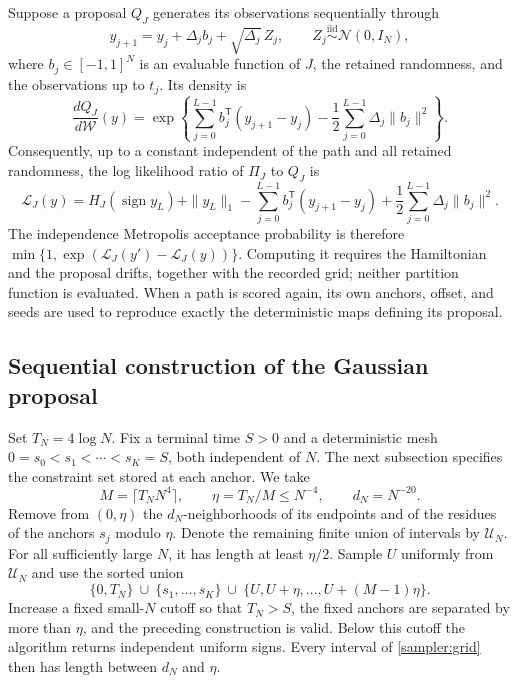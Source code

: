 \documentclass[11pt,reqno]{amsart}
\newcommand{\sign}{\operatorname{sign}}
\begin{document}
Suppose a proposal $Q_J$ generates its observations sequentially through
\begin{equation*}
 y_{j+1}=y_j+\Delta_j b_j+\sqrt{\Delta_j}\,Z_j,
 \qquad Z_j\stackrel{\mathrm{iid}}{\sim}\mathcal N(0,I_N),
\end{equation*}
where $b_j\in[-1,1]^N$ is an evaluable function of $J$, the retained
randomness, and the observations up to $t_j$. Its density is
\[
 \frac{dQ_J}{d\mathcal W}(y)
 =\exp\left\{\sum_{j=0}^{L-1}b_j^{\mathsf T}(y_{j+1}-y_j)
                   -\frac12\sum_{j=0}^{L-1}\Delta_j\|b_j\|^2\right\}.
\]
Consequently, up to a constant independent of the path and all retained
randomness, the log likelihood ratio of $\Pi_J$ to $Q_J$ is
\begin{equation}\label{sampler:log-weight}
 \mathcal L_J(y)
 =H_J(\sign y_L)+\|y_L\|_1
  -\sum_{j=0}^{L-1}b_j^{\mathsf T}(y_{j+1}-y_j)
  +\frac12\sum_{j=0}^{L-1}\Delta_j\|b_j\|^2.
\end{equation}
The independence Metropolis acceptance probability is therefore
$\min\{1,\exp(\mathcal L_J(y')-\mathcal L_J(y))\}$.
Computing it requires the Hamiltonian and the proposal drifts, together
with the recorded grid; neither partition function is evaluated.
When a path is scored again, its own anchors, offset, and seeds are used
to reproduce exactly the deterministic maps defining its proposal.

\subsection{Sequential construction of the Gaussian proposal}

Set $T_N=4\log N$. Fix a terminal time $S>0$ and a deterministic mesh
$0=s_0<s_1<\cdots<s_K=S$, both independent of $N$.
The next subsection specifies the constraint set stored at each anchor.
We take
\[
 M=\lceil T_NN^4\rceil,\qquad \eta=T_N/M\le N^{-4},
 \qquad d_N=N^{-20}.
\]
Remove from $(0,\eta)$ the $d_N$-neighborhoods of its endpoints and of
the residues of the anchors $s_j$ modulo $\eta$. Denote the remaining
finite union of intervals by $\mathcal U_N$. For all sufficiently large
$N$, it has length at least $\eta/2$. Sample $U$ uniformly from
$\mathcal U_N$ and use the sorted union
\begin{equation}\label{sampler:grid}
 \{0,T_N\}\ \cup\ \{s_1,\ldots,s_K\}\ \cup\
 \{U,U+\eta,\ldots,U+(M-1)\eta\}.
\end{equation}
Increase a fixed small-$N$ cutoff so that $T_N>S$, the fixed anchors are
separated by more than $\eta$, and the preceding construction is valid.
Below this cutoff the algorithm returns independent uniform signs.
Every interval of \eqref{sampler:grid} then has length between $d_N$
and $\eta$.
\end{document}

